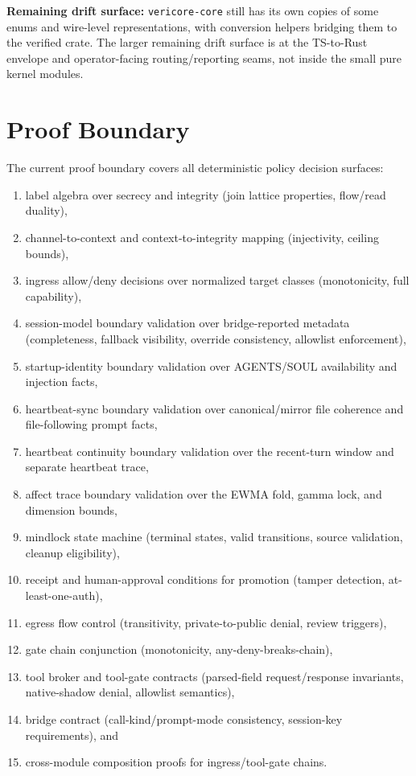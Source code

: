 \documentclass[11pt]{article}
\begin{document}
\textbf{Remaining drift surface:} \texttt{vericore-core} still has its own copies of some enums and wire-level representations, with conversion helpers bridging them to the verified crate. The larger remaining drift surface is at the TS-to-Rust envelope and operator-facing routing/reporting seams, not inside the small pure kernel modules.

\section{Proof Boundary}
The current proof boundary covers all deterministic policy decision surfaces:
\begin{enumerate}[label=\arabic*.]
\item label algebra over secrecy and integrity (join lattice properties, flow/read duality),
\item channel-to-context and context-to-integrity mapping (injectivity, ceiling bounds),
\item ingress allow/deny decisions over normalized target classes (monotonicity, full capability),
\item session-model boundary validation over bridge-reported metadata (completeness, fallback visibility, override consistency, allowlist enforcement),
\item startup-identity boundary validation over AGENTS/SOUL availability and injection facts,
\item heartbeat-sync boundary validation over canonical/mirror file coherence and file-following prompt facts,
\item heartbeat continuity boundary validation over the recent-turn window and separate heartbeat trace,
\item affect trace boundary validation over the EWMA fold, gamma lock, and dimension bounds,
\item mindlock state machine (terminal states, valid transitions, source validation, cleanup eligibility),
\item receipt and human-approval conditions for promotion (tamper detection, at-least-one-auth),
\item egress flow control (transitivity, private-to-public denial, review triggers),
\item gate chain conjunction (monotonicity, any-deny-breaks-chain),
\item tool broker and tool-gate contracts (parsed-field request/response invariants, native-shadow denial, allowlist semantics),
\item bridge contract (call-kind/prompt-mode consistency, session-key requirements), and
\item cross-module composition proofs for ingress/tool-gate chains.
\end{enumerate}
\end{document}
